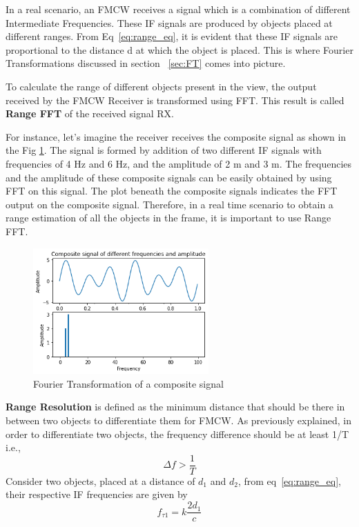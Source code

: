 In a real scenario, an FMCW receives a signal which is a combination of different Intermediate Frequencies. These IF signals are produced by objects placed at different ranges. From Eq~\ref{eq:range_eq}, it is evident that these IF signals are proportional to the distance d at which the object is placed.
This is where Fourier Transformations discussed in section ~\ref{sec:FT} comes into picture.

To calculate the range of different objects present in the view, the output received by the FMCW Receiver is transformed using FFT. This result is called \textbf{Range FFT} of the received signal RX.

For instance, let's imagine the receiver receives the composite signal as shown in the Fig \ref{fig:comp_fft}. The signal is formed by addition of two different IF signals with frequencies of 4 Hz and 6 Hz, and the amplitude of 2 m and 3 m.
The frequencies and the amplitude of these composite signals can be easily obtained by using FFT on this signal. The plot beneath the composite signals indicates the FFT output on the composite signal.
Therefore, in a real time scenario to obtain a range estimation of all the objects in the frame, it is important to use Range FFT.
 \begin{figure}[ht]
  \begin{center}
    \includegraphics[width=0.6\textwidth]{Master's thesis/images/comp_fft.png} 
    \caption{Fourier Transformation of a composite signal}
    \label{fig:comp_fft}
  \end{center}
\end{figure}  

\textbf{Range Resolution} is defined as the minimum distance that should be there in between two objects to differentiate them for FMCW. As previously explained, in order to differentiate two objects, the frequency difference should be at least 1/T i.e., 
\begin{equation}\label{eq:fgtt}
 \Delta f > \frac{1}{T}  
\end{equation}Consider two objects, placed at a distance of $d_{1}$ and $d_{2}$, from eq~\ref{eq:range_eq}, their respective IF frequencies are given by
 \begin{equation}
   f_{\tau1}= k\frac{2d_{1}}{c}
 \end{equation} 
 
